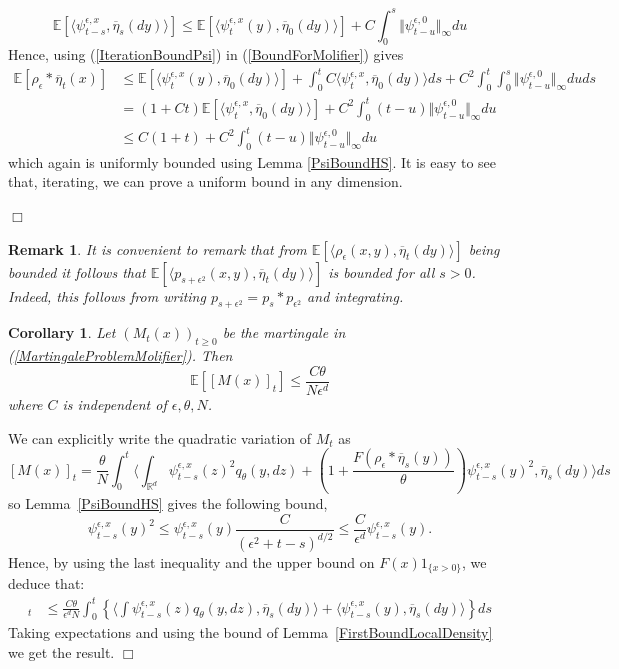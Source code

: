 \documentclass[12pt]{article}
\newenvironment {proof}{{\noindent\bf Proof }}{\hfill $\Box$ \medskip}
\newtheorem{remark}[theorem]{Remark}
\newtheorem{corollary}[theorem]{Corollary}
\newcommand{\IE}{\mathbb E}
\begin{document}
\begin{proof}
\begin{equation}
\IE[\langle \psi_{t-s}^{\epsilon,x}, \overline{\eta}_s(dy)\rangle] \leq \IE[\langle \psi_{t}^{\epsilon,x}(y), \overline{\eta}_0(dy) \rangle]  + C \int_0^s \Vert \psi_{t-u}^{\epsilon,0} \Vert_\infty du
\end{equation}
Hence, using (\ref{IterationBoundPsi}) in (\ref{BoundForMolifier}) gives
\begin{align*}
\IE[ \rho_\epsilon * \overline{\eta}_t(x)  ] &\leq \IE[\langle \psi_t^{\epsilon,x}(y), \overline{\eta}_0(dy) \rangle] + \int_0^t C\langle \psi_{t}^{\epsilon,x}, \overline{\eta}_0(dy)\rangle ds + C^2 \int_0^t \int_0^s  \Vert \psi_{t-u}^{\epsilon,0} \Vert_\infty du ds \\ &= (1+Ct) \IE[ \langle \psi_t^{\epsilon,x}, \overline{\eta}_0(dy) \rangle] + C^2 \int_0^t (t-u) \Vert \psi_{t-u}^{\epsilon,0} \Vert_\infty du \\ &\leq C(1+t) + C^2 \int_0^t (t-u) \Vert \psi_{t-u}^{\epsilon,0} \Vert_\infty du
\end{align*}
which again is uniformly bounded using Lemma \ref{PsiBoundHS}. It is easy to see that, iterating, we can prove a uniform bound in any dimension. 

\end{proof}

\begin{remark} \label{Remark:BoundLocalDensity}
It is convenient to remark that from $\IE\left[ \langle \rho_\epsilon(x,y), \overline{\eta}_t(dy) \rangle \right]$ being bounded it follows that $\IE[ \langle p_{s+\epsilon^2}(x,y), \overline{\eta}_t(dy) \rangle ]$ is bounded for all $s>0$. Indeed, this follows from writing $p_{s+\epsilon^2} = p_s * p_{\epsilon^2}$ and integrating.
\end{remark}

\begin{corollary}
Let $(M_t(x))_{t \geq 0}$ be the martingale in (\ref{MartingaleProblemMolifier}). Then
\[ \IE\left[ [M(x)]_t \right] \leq \frac{C \theta}{ N \epsilon^{d}} \]
where $C$ is independent of $\epsilon,\theta,N$. \label{Cor:ControlQVMQ}
\end{corollary}
\begin{proof}
We can explicitly write the quadratic variation of $M_t$ as
\[ [M(x)]_t = \frac{\theta}{N} \int_0^t \langle \int_{\mathbb{R}^d} \psi_{t-s}^{\epsilon,x}(z)^2 q_\theta(y,dz) + \left(1+\frac{F(\rho_\epsilon * \overline{\eta}_s(y))}{\theta}\right)\psi_{t-s}^{\epsilon,x}(y)^2, \overline{\eta}_s(dy) \rangle  ds\]
so Lemma~\ref{PsiBoundHS} gives the following bound,
\[ \psi_{t-s}^{\epsilon,x}(y)^2 \leq \psi_{t-s}^{\epsilon,x}(y) \frac{C}{(\epsilon^2+t-s)^{d/2}} \leq \frac{C}{\epsilon^d} \psi_{t-s}^{\epsilon,x}(y). \]
Hence, by using the last inequality and the upper bound on $F(x)1_{\{x > 0\}}$, we deduce that:
\begin{align}
[M(x)]_t &\leq \frac{C \theta}{\epsilon^d N} \int_0^t \left\{  \langle \int \psi_{t-s}^{\epsilon,x}(z) q_\theta(y,dz), \overline{\eta}_s(dy) \rangle + \langle \psi_{t-s}^{\epsilon,x}(y), \overline{\eta}_s(dy)\rangle \right\} ds 
\label{QuadVarBound} \end{align}
Taking expectations and using the bound of Lemma~\ref{FirstBoundLocalDensity} we get the result.
\end{proof}
\end{document}
